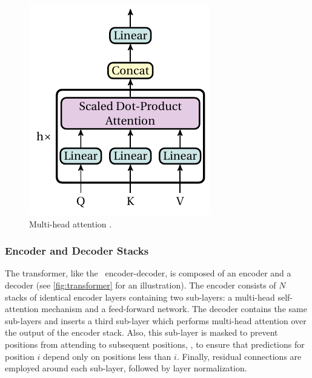 \begin{figure}[!h]
\begin{minipage}{0.3\columnwidth}
        \includegraphics[width=\columnwidth]{chapter2/pictures/multihead_attention.pdf}
        \caption{Multi-head attention \citep{vaswani2017attention}.}
        \label{fig:multi_head_attention}
    \end{minipage}
\end{figure}

\subsubsection{Encoder and Decoder Stacks}
The transformer, like the \rnn\ encoder-decoder, is composed of an encoder and a decoder (see \autoref{fig:transformer} for an illustration).
The encoder consists of $N$ stacks of identical encoder layers containing two sub-layers: a multi-head self-attention mechanism and a feed-forward network. The decoder contains the same sub-layers and inserts a third sub-layer which performs multi-head attention over the output of the encoder stack. Also, this sub-layer is masked to prevent positions from attending to subsequent positions, \ie, to ensure that predictions for position $i$ depend only on positions less than $i$. Finally, residual connections are employed around each sub-layer, followed by layer normalization.


